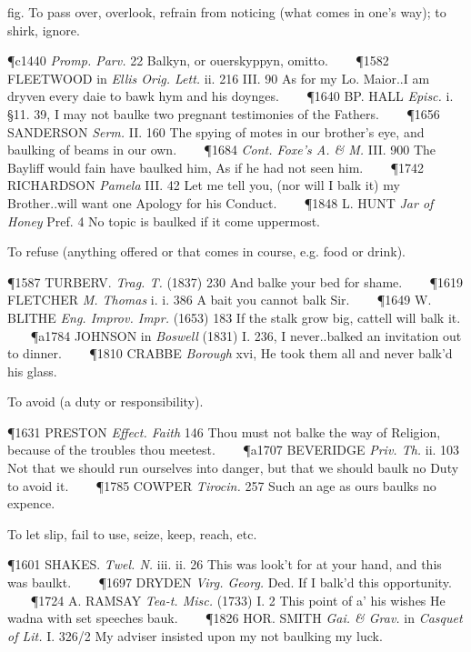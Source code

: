 \begin{description}[wide, labelwidth=!, labelindent=0pt]
\begin{myenumerate}
 fig. To pass over, overlook, refrain from noticing (what comes in one's way); to shirk, ignore.

\P c1440 \textit{Promp. Parv.} 22 Balkyn, or ouerskyppyn, omitto.    
\P 1582 FLEETWOOD in  \textit{Ellis Orig. Lett.} ii. 216 III. 90 As for my Lo. Maior..I am dryven every daie to bawk hym and his doynges.    
\P 1640 BP. HALL  \textit{Episc.} i. §11. 39, I may not baulke two pregnant testimonies of the Fathers.    
\P 1656 SANDERSON  \textit{Serm.} II. 160 The spying of motes in our brother's eye, and baulking of beams in our own.    
\P 1684 \textit{Cont.  Foxe's A. \& M.} III. 900 The Bayliff would fain have baulked him, As if he had not seen him.    
\P 1742 RICHARDSON  \textit{Pamela} III. 42 Let me tell you, (nor will I balk it) my Brother..will want one Apology for his Conduct.    
\P 1848 L. HUNT  \textit{Jar of Honey} Pref. 4 No topic is baulked if it come uppermost.

 To refuse (anything offered or that comes in course, e.g. food or drink).

\P 1587 TURBERV.  \textit{Trag. T.} (1837) 230 And balke your bed for shame.    
\P 1619 FLETCHER  \textit{M. Thomas} i. i. 386 A bait you cannot balk Sir.    
\P 1649 W. BLITHE  \textit{Eng. Improv. Impr.} (1653) 183 If the stalk grow big, cattell will balk it.    
\P a1784 JOHNSON in \textit{Boswell} (1831) I. 236, I never..balked an invitation out to dinner.    
\P 1810 CRABBE  \textit{Borough} xvi, He took them all and never balk'd his glass.

 To avoid (a duty or responsibility).

\P 1631 PRESTON  \textit{Effect. Faith} 146 Thou must not balke the way of Religion, because of the troubles thou meetest.    
\P a1707 BEVERIDGE \textit{Priv. Th.} ii. 103 Not that we should run ourselves into danger, but that we should baulk no Duty to avoid it.    
\P 1785 COWPER  \textit{Tirocin.} 257 Such an age as ours baulks no expence.

 To let slip, fail to use, seize, keep, reach, etc.

\P 1601 SHAKES.  \textit{Twel. N.} iii. ii. 26 This was look't for at your hand, and this was baulkt.    
\P 1697 DRYDEN  \textit{Virg. Georg.} Ded. If I balk'd this opportunity.    
\P 1724 A. RAMSAY  \textit{Tea-t. Misc.} (1733) I. 2 This point of a' his wishes He wadna with set speeches bauk.    
\P 1826 HOR. SMITH  \textit{Gai. \& Grav.} in \textit{Casquet of Lit.} I. 326/2 My adviser insisted upon my not baulking my luck.


\end{myenumerate}
\end{description}
